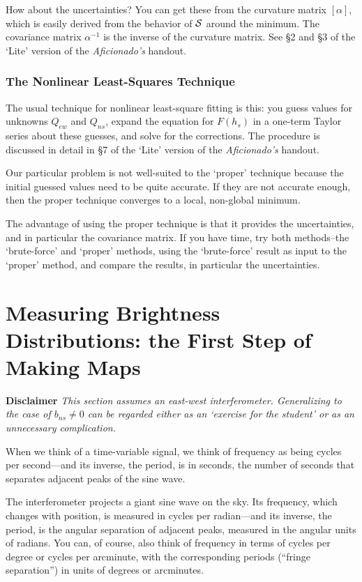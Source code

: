 \documentclass[11pt,preprint]{aastex}
\begin{document}
How about the uncertainties? You can get these from the curvature
matrix $[\alpha]$, which is easily derived from the behavior of $\cal
S$ around the minimum. The covariance matrix $\alpha^{-1}$ is the
inverse of the curvature matrix. See \S 2 and \S 3 of
the `Lite' version of the {\it Aficionado's} handout.

\subsubsection{The Nonlinear Least-Squares Technique}

\noindent

The usual technique for nonlinear least-square fitting is this: you
guess values for unknowns $Q_{ew}$ and $Q_{ns}$, expand the equation for
$F(h_s)$ in a one-term Taylor series about these guesses, and solve for
the corrections.  The procedure is discussed in detail in \S 7 of
the `Lite' version of the {\it Aficionado's} handout.

Our particular problem is not well-suited to the `proper' technique
because the initial guessed values need to be quite accurate. If they
are not accurate enough, then the proper technique converges to a local,
non-global minimum. 

The advantage of using the proper technique is that it provides the
uncertainties, and in particular the covariance matrix. If you have
time, try both methods--the `brute-force' and `proper' methods, using
the `brute-force' result as input to the `proper' method, and compare
the results, in particular the uncertainties. 

\section{Measuring Brightness Distributions: the First Step of Making Maps} \label{mun}

\noindent
{\bf Disclaimer} {\it This section assumes an east-west
interferometer. Generalizing to the case of $b_{ns} \ne 0$ can be
regarded either as an `exercise for the student' or as an unnecessary complication.}

	When we think of a time-variable signal, we think of frequency
as being cycles per second---and its inverse, the period, is in seconds,
the number of seconds that separates adjacent peaks of the sine wave. 

	The interferometer projects a giant sine wave on the sky. Its
frequency, which changes with position, is measured in cycles per
radian---and its inverse, the period, is the angular separation of
adjacent peaks, measured in the angular units of radians. You can, of
course, also think of frequency in terms of cycles per degree or cycles
per arcminute, with the corresponding periods (``fringe separation'') in
units of degrees or arcminutes. 
\end{document}
